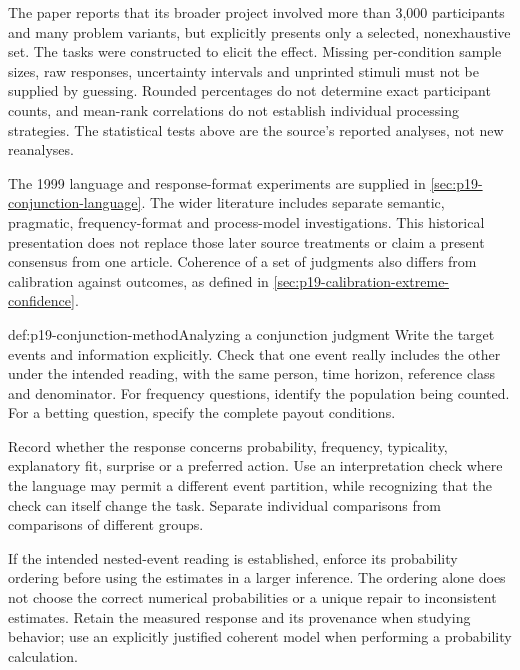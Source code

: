 The paper reports that its broader project involved more than 3,000
participants and many problem variants, but explicitly presents only
a selected, nonexhaustive set. The tasks were constructed to elicit
the effect. Missing per-condition sample sizes, raw responses,
uncertainty intervals and unprinted stimuli must not be supplied by
guessing. Rounded percentages do not determine exact participant
counts, and mean-rank correlations do not establish individual
processing strategies. The statistical tests above are the source's
reported analyses, not new reanalyses.

The 1999 language and response-format experiments are supplied in
\cref{sec:p19-conjunction-language}. The wider literature includes separate semantic,
pragmatic, frequency-format and process-model investigations.
This historical presentation does not replace those later source
treatments or claim a present consensus from one article.
Coherence of a set of judgments also differs from calibration against
outcomes, as defined in \cref{sec:p19-calibration-extreme-confidence}.

\begin{hbmethod}{def:p19-conjunction-method}{Analyzing a conjunction judgment}
Write the target events and information explicitly. Check that one
event really includes the other under the intended reading, with
the same person, time horizon, reference class and denominator.
For frequency questions, identify the population being counted.
For a betting question, specify the complete payout conditions.

Record whether the response concerns probability, frequency,
typicality, explanatory fit, surprise or a preferred action.
Use an interpretation check where the language may permit a
different event partition, while recognizing that the check can
itself change the task. Separate individual comparisons from
comparisons of different groups.

If the intended nested-event reading is established, enforce its
probability ordering before using the estimates in a larger inference.
The ordering alone does not choose the correct numerical probabilities
or a unique repair to inconsistent estimates. Retain the measured
response and its provenance when studying behavior; use an explicitly
justified coherent model when performing a probability calculation.
\end{hbmethod}
